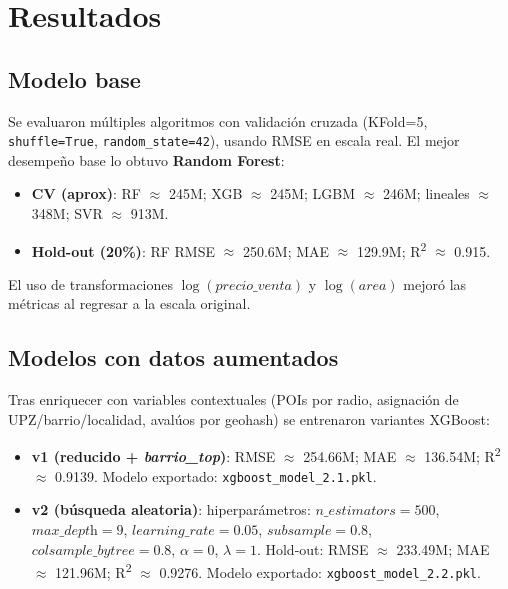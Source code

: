 \section{Resultados}
\subsection{Modelo base}
Se evaluaron múltiples algoritmos con validación cruzada (KFold=5, \texttt{shuffle=True}, \texttt{random\_state=42}), usando RMSE en escala real. El mejor desempeño base lo obtuvo \textbf{Random Forest}:
\begin{itemize}
    \item \textbf{CV (aprox)}: RF \(\approx\) 245M; XGB \(\approx\) 245M; LGBM \(\approx\) 246M; lineales \(\approx\) 348M; SVR \(\approx\) 913M.
    \item \textbf{Hold-out (20\%)}: RF RMSE \(\approx\) 250.6M; MAE \(\approx\) 129.9M; R\textsuperscript{2} \(\approx\) 0.915.
\end{itemize}
El uso de transformaciones \(\log(\textit{precio\_venta})\) y \(\log(\textit{area})\) mejoró las métricas al regresar a la escala original.

\subsection{Modelos con datos aumentados}
Tras enriquecer con variables contextuales (POIs por radio, asignación de UPZ/barrio/localidad, avalúos por geohash) se entrenaron variantes XGBoost:
\begin{itemize}
    \item \textbf{v1 (reducido + \textit{barrio\_top})}: RMSE \(\approx\) 254.66M; MAE \(\approx\) 136.54M; R\textsuperscript{2} \(\approx\) 0.9139. Modelo exportado: \texttt{xgboost\_model\_2.1.pkl}.
    \item \textbf{v2 (búsqueda aleatoria)}: hiperparámetros: \(n\_\textit{estimators}=500\), \(\textit{max\_depth}=9\), \(\textit{learning\_rate}=0.05\), \(\textit{subsample}=0.8\), \(\textit{colsample\_bytree}=0.8\), \(\alpha=0\), \(\lambda=1\). Hold-out: RMSE \(\approx\) 233.49M; MAE \(\approx\) 121.96M; R\textsuperscript{2} \(\approx\) 0.9276. Modelo exportado: \texttt{xgboost\_model\_2.2.pkl}.
\end{itemize}

